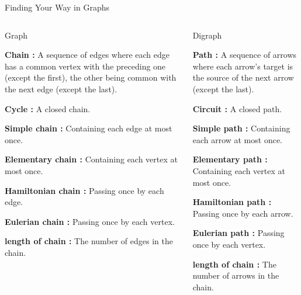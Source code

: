 \documentclass[32pt,aspectratio=169]{beamer}
\begin{document}
\begin{frame}{Finding Your Way in Graphs}
  \begin{columns}
    \begin{column}{.55\textwidth}
      \begin{halfshyblock}{Graph}
        {\small
        \textbf{Chain :} A sequence of edges where each edge has a
        common vertex with the preceding one (except the first), the
        other being common with the next edge (except the last).

        \textbf{Cycle :} A closed chain.

        \textbf{Simple chain :} Containing each edge at most once.

        \textbf{Elementary chain :} Containing each vertex at most
        once.

        \textbf{Hamiltonian chain :} Passing once by each edge.

        \textbf{Eulerian chain :} Passing once by each vertex.

        \textbf{length of chain :} The number of edges in the chain.
      }
      \end{halfshyblock}
    \end{column}
    \begin{column}{.55\textwidth}
      \begin{halfshyblock}{Digraph}
        {\small \textbf{Path :} A sequence of arrows where each
          arrow's target is the source of the next arrow (except the
          last).

          \vspace{\baselineskip}

        \textbf{Circuit :} A closed path.

        \textbf{Simple path :} Containing each arrow at most once.

        \textbf{Elementary path :} Containing each vertex at most
        once.

        \textbf{Hamiltonian path :} Passing once by each arrow.

        \textbf{Eulerian path :} Passing once by each vertex.

        \textbf{length of chain :} The number of arrows in the chain.
      }
      \end{halfshyblock}
    \end{column}
  \end{columns}
\end{frame}
\end{document}
